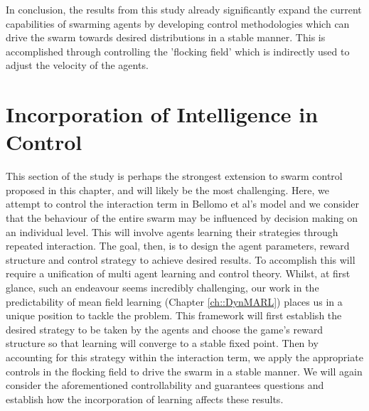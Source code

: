 \documentclass[.../main.tex]{subfiles}
\begin{document}
	In conclusion, the results from this study already significantly expand the current capabilities of
	swarming agents by developing control methodologies which can drive the swarm towards desired
	distributions in a stable manner. This is accomplished through controlling the 'flocking field'
	which is indirectly used to adjust the velocity of the agents.

    \section{Incorporation of Intelligence in Control} \label{sec::Intelligence_in_control}

    This section of the study is perhaps the strongest extension to swarm control proposed in this
	chapter, and will likely be the most challenging. Here, we attempt to control the interaction term
	in Bellomo et al's model and we consider that the behaviour of the entire swarm may be influenced
	by decision making on an individual level. This will involve agents learning their strategies
	through repeated interaction. The goal, then, is to design the agent parameters, reward structure
	and control strategy to achieve desired results. To accomplish this will require a unification of
	multi agent learning and control theory. Whilst, at first glance, such an endeavour seems
	incredibly challenging, our work in the predictability of mean field learning (Chapter 
	\ref{ch::DynMARL}) places us in a unique position to tackle the problem. This framework will
	first establish the desired strategy to be taken by the agents and choose the game's reward
	structure so that learning will converge to a stable fixed point. Then by accounting for this
	strategy within the interaction term, we apply the appropriate controls in the flocking field to
	drive the swarm in a stable manner. We will again consider the aforementioned controllability
	and guarantees questions and establish how the incorporation of learning affects these results.
\end{document}
